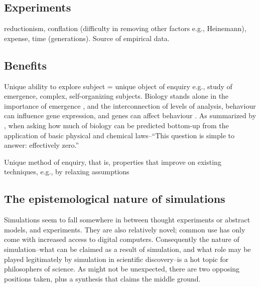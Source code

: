 \subsection{Experiments}\label{experiments}

reductionism, conflation (difficulty in removing other factors e.g.,
Heinemann), expense, time (generations). Source of empirical data.


\subsection{Benefits}\label{benefits}

Unique ability to explore subject = unique object of enquiry e.g., study
of emergence, complex, self-organizing subjects. Biology stands alone in
the importance of emergence \autocite{Bersini:2006ve}, and the
interconnection of levels of analysis, \eg behaviour can influence gene
expression, and genes can affect behaviour \autocite{Krakauer2011}. As
summarized by \autocite{Krakauer2011}, when asking how much of biology
can be predicted bottom-up from the application of basic physical and
chemical laws--``This question is simple to answer: effectively zero.''

Unique method of enquiry, that is, properties that improve on existing
techniques, e.g., by relaxing assumptions

\subsection{The epistemological nature of simulations}\label{the-epistemological-nature-of-simulations}

Simulations seem to fall somewhere in between thought experiments or
abstract models, and experiments. They are also relatively novel; common
use has only come with increased access to digital computers.
Consequently the nature of simulation--what can be claimed as a result
of simulation, and what role may be played legitimately by simulation in
scientific discovery--is a hot topic for philosophers of science. As
might not be unexpected, there are two opposing positions taken, plus a
synthesis that claims the middle ground.

\label{simulations-are-just-calculators}

